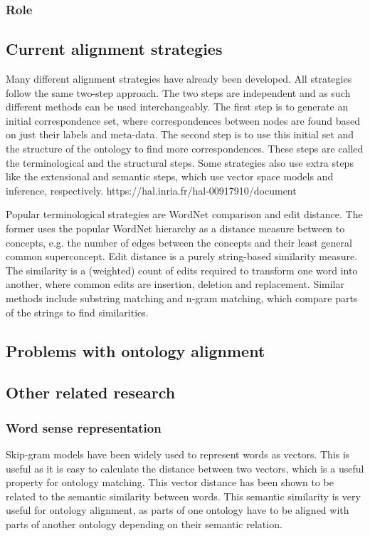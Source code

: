 \documentclass{article}
\begin{document}
 \subsubsection{Role}
 \subsection{Current alignment strategies}
 Many different alignment strategies have already been developed. All strategies follow the same two-step approach. The two steps are independent and as such different methods can be used interchangeably. The first step is to generate an initial correspondence set, where correspondences between nodes are found based on just their labels and meta-data. The second step is to use this initial set and the structure of the ontology to find more correspondences. These steps are called the terminological and the structural steps. Some strategies also use extra steps like the extensional and semantic steps, which use vector space models and inference, respectively. https://hal.inria.fr/hal-00917910/document
 
 Popular terminological strategies are WordNet comparison and edit distance. The former uses the popular WordNet hierarchy as a distance measure between to concepts, e.g. the number of edges between the concepts and their least general common superconcept. %
 Edit distance is a purely string-based similarity measure. The similarity is a (weighted) count of edits required to transform one word into another, where common edits are insertion, deletion and replacement. Similar methods include substring matching and n-gram matching, which compare parts of the strings to find similarities. %
 \subsection{Problems with ontology alignment}
 \subsection{Other related research}
 \subsubsection{Word sense representation}
 Skip-gram models have been widely used to represent words as vectors. This is useful as it is easy to calculate the distance between two vectors, which is a useful property for ontology matching. This vector distance has been shown to be related to the semantic similarity between words. This semantic similarity is very useful for ontology alignment, as parts of one ontology have to be aligned with parts of another ontology depending on their semantic relation.
 
\end{document}
